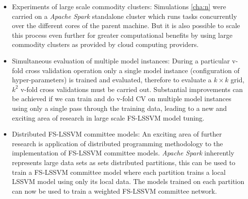 \begin{itemize}
\item Experiments of large scale commodity clusters:
Simulations \ref{cha:n} were carried on a \emph{Apache Spark} standalone cluster which runs tasks concurrently over the different cores of the parent machine. But it is also possible to scale this process even further for greater computational benefits by using large commodity clusters as provided by cloud computing providers.

\item Simultaneous evaluation of multiple model instances:
During a particular v-fold cross validation operation only a single model instance (configuration of hyper-parameters) is trained and  evaluated, therefore to evaluate a $k \times k$ grid, $k^2$ v-fold cross validations must be carried out. Substantial improvements can be achieved if we can train and do v-fold CV on multiple model instances using only a single pass through the training data, leading to a new and exciting area of research in large scale FS-LSSVM model tuning.

\item Distributed FS-LSSVM committee models:
An exciting area of further research is application of distributed programming methodology to the implementation of FS-LSSVM committee models. \emph{Apache Spark} inherently represents large data sets as sets distributed partitions, this can be used to train a FS-LSSVM committee model where each partition trains a local LSSVM model using only its local data. The models trained on each partition can now be used to train a weighted FS-LSSVM committee network.

\end{itemize}